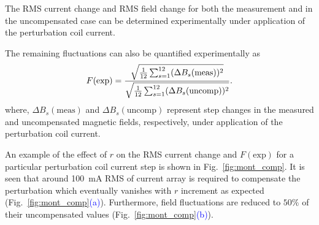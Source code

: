 

The RMS current change and RMS field change for both the measurement and in the uncompensated case can be determined experimentally under application of the perturbation coil current.


The remaining fluctuations can also be quantified experimentally as
\begin{equation}\label{eq:fluc_exp}
   F(\mathrm{exp})=\frac{\sqrt{\frac{1}{12} \sum_{s=1}^{12} (\Delta B_s(\text{meas}))^2}}{\sqrt{\frac{1}{12} \sum_{s=1}^{12} (\Delta B_s(\text{uncomp}))^2}}{\rm .}
\end{equation}
where, $\Delta B_s(\text{meas})$ and $\Delta B_s(\text{uncomp})$ represent step changes in the measured and uncompensated magnetic fields, respectively, under application of the perturbation coil current.



An example of the effect of $r$ on the RMS current change  and $F(\mathrm{exp})$ for a particular perturbation coil current step is shown in Fig.~\ref{fig:mont_comp}. It is seen that around 100~mA RMS of current array is required to compensate the perturbation
which eventually vanishes with $r$ increment as expected (Fig.~\ref{fig:mont_comp}\textcolor{blue}{(a)}). Furthermore, field fluctuations are reduced to $50\%$ of their uncompensated values (Fig.~\ref{fig:mont_comp}\textcolor{blue}{(b)}).



